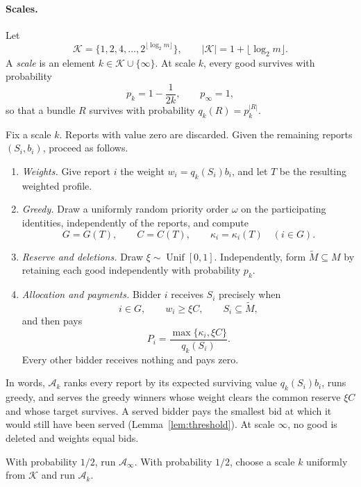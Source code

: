 \documentclass[format=acmsmall, review=false]{acmart}
\begin{document}
\paragraph{Scales.}
Let
\[
\mathcal K=\bigl\{1,2,4,\ldots,2^{\lfloor\log_2m\rfloor}\bigr\},
\qquad
|\mathcal K|=1+\lfloor\log_2m\rfloor.
\]
A \emph{scale} is an element \(k\in\mathcal K\cup\{\infty\}\). At
scale \(k\), every good survives with probability
\[
p_k=1-\frac{1}{2k},
\qquad
p_\infty=1,
\]
so that a bundle \(R\) survives with probability
\(q_k(R)=p_k^{|R|}\).

\begin{definition}
\label{def:Ak}
Fix a scale \(k\). Reports with value zero are discarded. Given
the remaining reports \((S_i,b_i)\), proceed as follows.
\begin{enumerate}
\item \emph{Weights.} Give report \(i\) the weight
\(w_i=q_k(S_i)b_i\), and let \(T\) be the resulting weighted
profile.
\item \emph{Greedy.} Draw a uniformly random priority order
\(\omega\) on the participating identities, independently of the
reports, and compute
\[
G=G(T),\qquad
C=C(T),\qquad
\kappa_i=\kappa_i(T)\quad(i\in G).
\]
\item \emph{Reserve and deletions.} Draw
\(\xi\sim\operatorname{Unif}[0,1]\). Independently, form
\(\widetilde M\subseteq M\) by retaining each good independently
with probability \(p_k\).
\item \emph{Allocation and payments.} Bidder \(i\) receives
\(S_i\) precisely when
\[
i\in G,\qquad w_i\ge\xi C,\qquad S_i\subseteq\widetilde M,
\]
and then pays
\begin{equation}\label{eq:actual-payment}
P_i=\frac{\max\{\kappa_i,\xi C\}}{q_k(S_i)}.
\end{equation}
Every other bidder receives nothing and pays zero.
\end{enumerate}
\end{definition}

In words, \(\mathcal A_k\) ranks every report by its expected
surviving value \(q_k(S_i)b_i\), runs greedy, and serves the
greedy winners whose weight clears the common reserve \(\xi C\)
and whose target survives. A served bidder pays the smallest bid
at which it would still have been served
(Lemma~\ref{lem:threshold}). At scale \(\infty\), no good is
deleted and weights equal bids.

\begin{definition}
\label{def:M}
With probability \(1/2\), run \(\mathcal A_\infty\). With
probability \(1/2\), choose a scale \(k\) uniformly from
\(\mathcal K\) and run \(\mathcal A_k\).
\end{definition}
\end{document}
